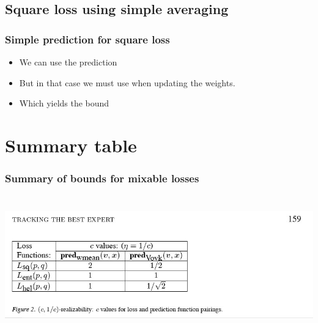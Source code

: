 \documentclass{beamer}
\begin{document}
\subsection{Square loss using simple averaging}

\begin{frame}
\frametitle{Simple prediction for square loss}
\begin{itemize}
\item We can use the prediction
\R{\[
\gamma = \frac{\sum_i \weight{i}{} \gamma_i}{\sum_i \weight{i}{}}
\]}
\item But in that case we must use  when updating the weights.
\item Which yields the bound
\end{itemize}
\end{frame}

\section{Summary table}

\begin{frame}
\frametitle{Summary of bounds for mixable losses}
\includegraphics[height=6cm]{figures/summarytable.jpg}
\end{frame}

%
\end{document}
